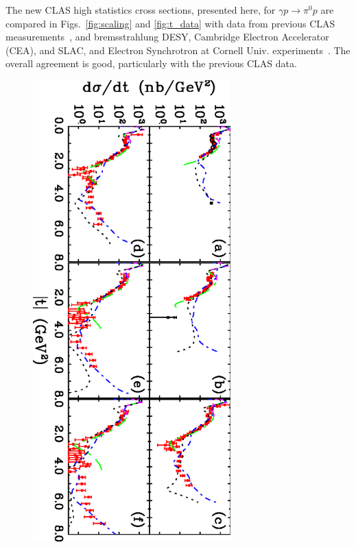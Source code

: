 \documentclass[aps,prc,twocolumn,floatfix,showpacs,preprintnumbers,amsmath,amssymb,superscriptaddress,linenumbers]{revtex4-1}
\begin{document}
The new CLAS high statistics cross sections, presented here, for
$\gamma p\rightarrow\pi^0p$ are compared in Figs.~\ref{fig:scaling}
and \ref{fig:t_data} with data from previous CLAS
measurements~\cite{Dugger:2007bt}, and bremsstrahlung DESY, Cambridge
Electron Accelerator (CEA), and SLAC, and Electron Synchrotron at
Cornell Univ. experiments~\cite{brem}. The overall agreement is good,
particularly with the previous CLAS data.
\begin{figure}[htb!]
\centerline{
        \includegraphics[width=3in, angle=90]{dsdt.eps}}


\end{figure}
\end{document}
